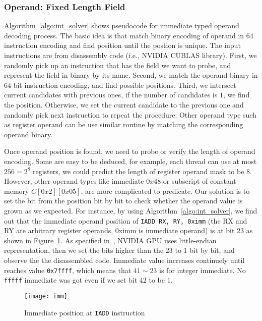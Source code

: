 \subsubsection{Operand: Fixed Length Field}
Algorithm~\ref{algo:int_solver} shows pseudocode for immediate typed operand decoding process. 
The basic idea is that match binary encoding of operand in $64$ instruction encoding and find
position until the postion is unique. The input instructions are from disassembly code (i.e., NVIDIA CUBLAS library).
First, we randomly pick up an instruction that has the field we want to probe, and represent the field in binary by its 
name. Second, we match the operand binary in $64$-bit instruction encoding, and find possible positions. Third, we 
intersect current candidates with previous ones, if the number of candidates is $1$, we find the position. Otherwise, 
we set the current candidate to the previous one and randomly pick next instruction to repeat the procedure.
Other operand type such as register operand can be use similar routine by matching the corresponding operand binary.

Once operand position is found, we need to probe or verify the length of operand encoding. Some are easy to be
deduced, for example, each thread can use at most $256=2^{8}$ registers, we could predict the length of register 
operand mask to be $8$.
However, other operand types like immediate $0x48$ or subscript of constant memory $C[0x2][0x05]$, are more complicated 
to predicate. Our solution is to set the bit from the position bit by bit to check whether the operand value is grown 
as we expected. For instance, by using Algorithm~\ref{algo:int_solver}, we find out that the immediate operand position 
of {\tt IADD RX, RY, 0ximm} (the RX and RY are arbitrary register operands, 0ximm is immediate operand) is at bit $23$ 
as shown in Figure~\ref{fig:imm}. As specified in~\cite{cuda2015programming}, NVIDIA GPU uses little-endian 
representation, then we set the bits higher than the $23$ to $1$ bit by bit, and observe the the disassembled code. 
Immediate value increases continuely until reaches value {\tt 0x7ffff}, which means that $41\sim23$ is for integer 
immediate. No {\tt fffff} immediate was got even if we set bit $42$ to be $1$.  

\begin{figure}[htbp]
\begin{center}
\texttt{[image: imm]}
    \caption{Immediate position at {\tt IADD} instruction}
\label{fig:imm}
\end{center}
\end{figure}

